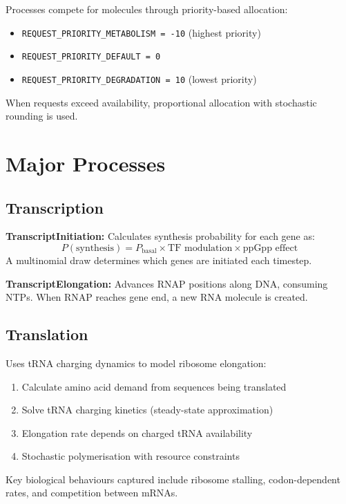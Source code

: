 \documentclass[11pt,a4paper]{report}
\begin{document}
Processes compete for molecules through priority-based allocation:

\begin{itemize}
    \item \texttt{REQUEST\_PRIORITY\_METABOLISM = -10} (highest priority)
    \item \texttt{REQUEST\_PRIORITY\_DEFAULT = 0}
    \item \texttt{REQUEST\_PRIORITY\_DEGRADATION = 10} (lowest priority)
\end{itemize}

When requests exceed availability, proportional allocation with stochastic rounding is used.

\section{Major Processes}

\subsection{Transcription}

\textbf{TranscriptInitiation:} Calculates synthesis probability for each gene as:
\[
P(\text{synthesis}) = P_{\text{basal}} \times \text{TF modulation} \times \text{ppGpp effect}
\]
A multinomial draw determines which genes are initiated each timestep.

\textbf{TranscriptElongation:} Advances RNAP positions along DNA, consuming NTPs. When RNAP reaches gene end, a new RNA molecule is created.

\subsection{Translation}

Uses tRNA charging dynamics to model ribosome elongation:

\begin{enumerate}
    \item Calculate amino acid demand from sequences being translated
    \item Solve tRNA charging kinetics (steady-state approximation)
    \item Elongation rate depends on charged tRNA availability
    \item Stochastic polymerisation with resource constraints
\end{enumerate}

Key biological behaviours captured include ribosome stalling, codon-dependent rates, and competition between mRNAs.
\end{document}
